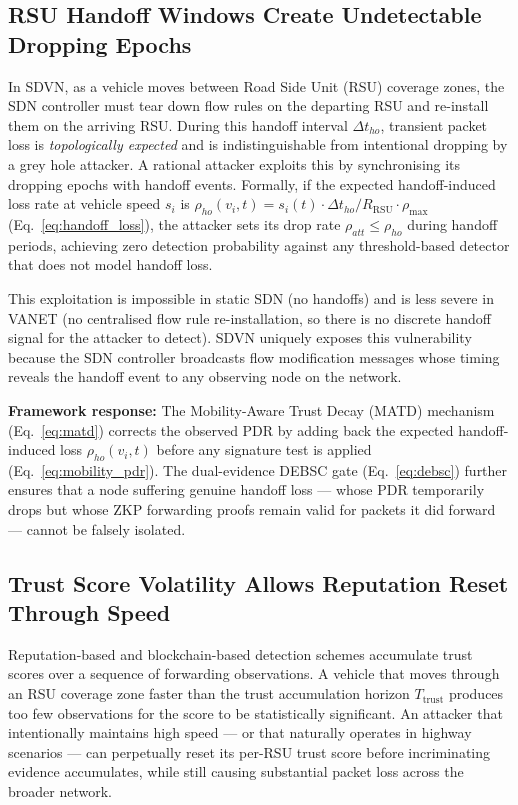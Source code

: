 \documentclass[12pt, a4paper]{report}
\newcommand{\mypar}{\vspace{0.8em}\noindent}
\begin{document}
\subsection{RSU Handoff Windows Create Undetectable Dropping Epochs}

In SDVN, as a vehicle moves between Road Side Unit (RSU) coverage zones, the SDN
controller must tear down flow rules on the departing RSU and re-install them on
the arriving RSU. During this handoff interval $\Delta t_{ho}$, transient packet
loss is \emph{topologically expected} and is indistinguishable from intentional
dropping by a grey hole attacker. A rational attacker exploits this by
synchronising its dropping epochs with handoff events. Formally, if the expected
handoff-induced loss rate at vehicle speed $s_i$ is
$\rho_{ho}(v_i,t) = {s_i(t) \cdot \Delta t_{ho}}/{R_{\text{RSU}}} \cdot
\rho_{\max}$ (Eq.~\eqref{eq:handoff_loss}), the attacker sets its drop rate
$\rho_{att} \leq \rho_{ho}$ during handoff periods, achieving zero detection
probability against any threshold-based detector that does not model handoff loss.

This exploitation is impossible in static SDN (no handoffs) and is less severe
in VANET (no centralised flow rule re-installation, so there is no discrete
handoff signal for the attacker to detect). SDVN uniquely exposes this
vulnerability because the SDN controller broadcasts flow modification messages
whose timing reveals the handoff event to any observing node on the network.

\mypar
\textbf{Framework response:} The Mobility-Aware Trust Decay (MATD) mechanism
(Eq.~\eqref{eq:matd}) corrects the observed PDR by adding back the expected
handoff-induced loss $\rho_{ho}(v_i,t)$ before any signature test is applied
(Eq.~\eqref{eq:mobility_pdr}). The dual-evidence DEBSC gate
(Eq.~\eqref{eq:debsc}) further ensures that a node suffering genuine handoff
loss — whose PDR temporarily drops but whose ZKP forwarding proofs remain valid
for packets it did forward — cannot be falsely isolated.

\subsection{Trust Score Volatility Allows Reputation Reset Through Speed}

Reputation-based and blockchain-based detection schemes accumulate trust scores
over a sequence of forwarding observations. A vehicle that moves through an RSU
coverage zone faster than the trust accumulation horizon $T_{\text{trust}}$
produces too few observations for the score to be statistically significant. An
attacker that intentionally maintains high speed — or that naturally operates in
highway scenarios — can perpetually reset its per-RSU trust score before
incriminating evidence accumulates, while still causing substantial packet loss
across the broader network.
\end{document}
